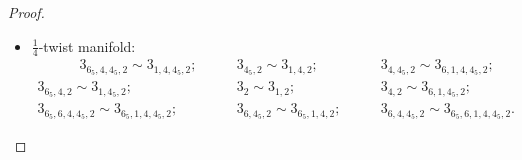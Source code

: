 \documentclass{amsart}
\theoremstyle{definition}
\theoremstyle{remark}
\begin{document}
\begin{proof}
\begin{itemize}
        Moreover we have:
        $$
            7 \cap_2 7_{6_5,6,1}; \quad \quad
             7_1 \cap_2 7_{6_5,6}; \quad \quad
             7_{6_5} \cap_2 7_{6,1}; \quad \quad
             7_{6_5,1} \cap_2 7_{6}.
        $$
        



        \item $\frac{1}{4}$-twist manifold:
        \begin{align*}
            \quad \quad \quad 3_{6_5,4,4_5,2} \sim 3_{1,4,4_5,2}; \quad \quad
            & 3_{4_5,2} \sim 3_{1,4,2}; \quad \quad
            & 3_{4,4_5,2} \sim 3_{6,1,4,4_5,2}; \\
            3_{6_5,4,2} \sim 3_{1,4_5,2}; \quad \quad
            & 3_{2} \sim 3_{1,2}; \quad \quad
            & 3_{4,2} \sim 3_{6,1,4_5,2}; \\
            3_{6_5,6,4,4_5,2} \sim 3_{6_5,1,4,4_5,2}; \quad \quad
            & 3_{6,4_5,2} \sim 3_{6_5,1,4,2}; \quad \quad
            & 3_{6,4,4_5,2} \sim 3_{6_5,6,1,4,4_5,2}.
        \end{align*}





\end{itemize}
\end{proof}
\end{document}
